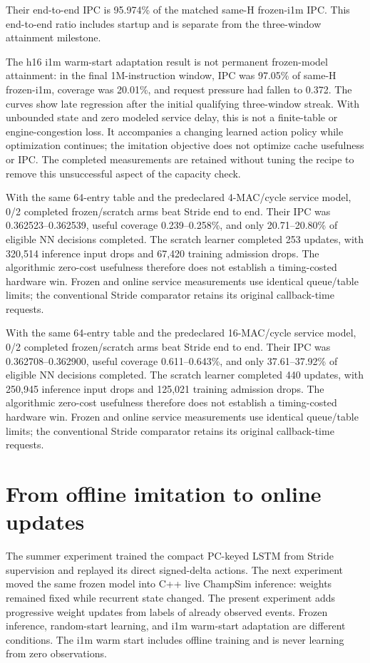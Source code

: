 \documentclass[10pt]{article}
\begin{document}
Their end-to-end IPC is 95.974\% of the matched same-H frozen-i1m IPC. This end-to-end ratio includes startup and is separate from the three-window attainment milestone.

The h16 i1m warm-start adaptation result is not permanent frozen-model attainment: in the final 1M-instruction window, IPC was 97.05\% of same-H frozen-i1m, coverage was 20.01\%, and request pressure had fallen to 0.372. The curves show late regression after the initial qualifying three-window streak. With unbounded state and zero modeled service delay, this is not a finite-table or engine-congestion loss. It accompanies a changing learned action policy while optimization continues; the imitation objective does not optimize cache usefulness or IPC. The completed measurements are retained without tuning the recipe to remove this unsuccessful aspect of the capacity check.

With the same 64-entry table and the predeclared 4-MAC/cycle service model, 0/2 completed frozen/scratch arms beat Stride end to end. Their IPC was 0.362523--0.362539, useful coverage 0.239--0.258\%, and only 20.71--20.80\% of eligible NN decisions completed. The scratch learner completed 253 updates, with 320,514 inference input drops and 67,420 training admission drops. The algorithmic zero-cost usefulness therefore does not establish a timing-costed hardware win. Frozen and online service measurements use identical queue/table limits; the conventional Stride comparator retains its original callback-time requests.

With the same 64-entry table and the predeclared 16-MAC/cycle service model, 0/2 completed frozen/scratch arms beat Stride end to end. Their IPC was 0.362708--0.362900, useful coverage 0.611--0.643\%, and only 37.61--37.92\% of eligible NN decisions completed. The scratch learner completed 440 updates, with 250,945 inference input drops and 125,021 training admission drops. The algorithmic zero-cost usefulness therefore does not establish a timing-costed hardware win. Frozen and online service measurements use identical queue/table limits; the conventional Stride comparator retains its original callback-time requests.

\section{From offline imitation to online updates}

The summer experiment trained the compact PC-keyed LSTM from Stride supervision and replayed its direct signed-delta actions. The next experiment moved the same frozen model into C++ live ChampSim inference: weights remained fixed while recurrent state changed. The present experiment adds progressive weight updates from labels of already observed events. Frozen inference, random-start learning, and i1m warm-start adaptation are different conditions. The i1m warm start includes offline training and is never learning from zero observations.
\end{document}
